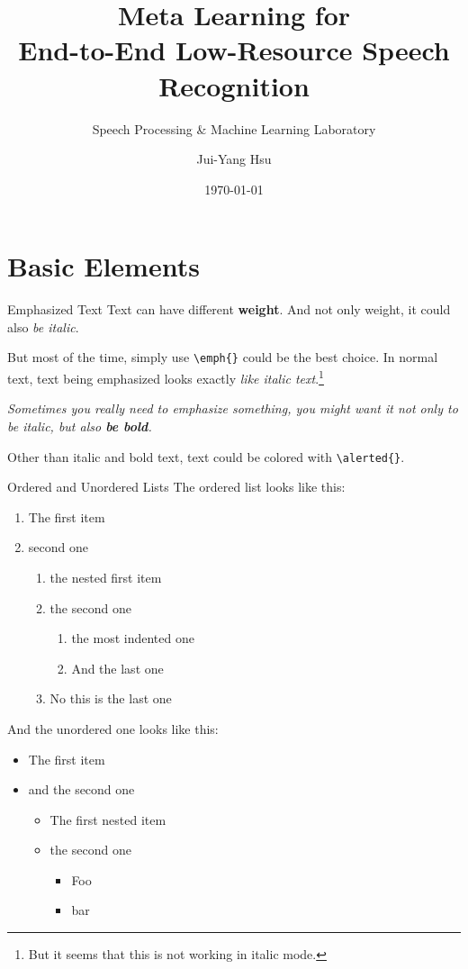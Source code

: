 \documentclass[10pt]{beamer}
\title{Meta Learning for \\ End-to-End Low-Resource Speech Recognition}
\subtitle{Speech Processing \& Machine Learning Laboratory}
\author{Jui-Yang Hsu}
\date{\today}
\begin{document}
\maketitle

\maketoc

\section{Basic Elements}

\begin{frame}{Emphasized Text}
  Text can have different \textbf{weight}.
  And not only weight, it could also \textit{be italic}.

  But most of the time, simply use \texttt{\textbackslash{}emph\{\}} could be the best choice.
  In normal text, text being emphasized looks exactly \emph{like italic text}.\footnote{But it seems that this is not working in italic mode.}

  \textit{Sometimes you really need to emphasize something, you might want it not only to be italic, but also \textbf{be bold}.}

  Other than italic and bold text, text could \alert{be colored} with \texttt{\textbackslash{}alerted\{\}}.
\end{frame}

\begin{frame}{Ordered and Unordered Lists}
  The ordered list looks like this:
  \begin{enumerate}
    \item The first item
    \item second one
          \begin{enumerate}
            \item the nested first item
            \item the second one
                  \begin{enumerate}
                    \item the most indented one
                    \item And the last one
                  \end{enumerate}
            \item No this is the last one
          \end{enumerate}
  \end{enumerate}

  And the unordered one looks like this:
  \begin{itemize}
    \item The first item
    \item and the second one
          \begin{itemize}
            \item The first nested item
            \item the second one
                  \begin{itemize}
                    \item Foo
                    \item bar
                  \end{itemize}
          \end{itemize}
  \end{itemize}
\end{frame}
\end{document}
